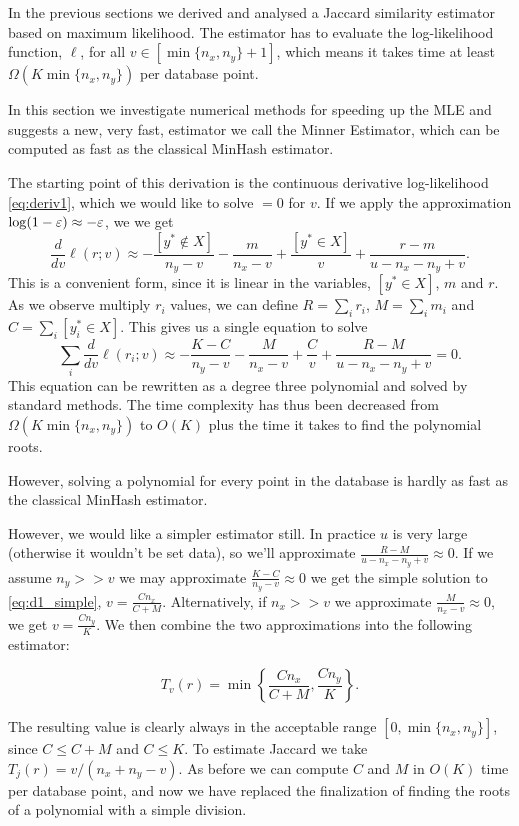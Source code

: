 In the previous sections we derived and analysed a Jaccard similarity estimator based on maximum likelihood.
The estimator has to evaluate the log-likelihood function, $\ell$, for all $v\in[\min\{n_x,n_y\}+1]$, which means it takes time at least $\Omega(K\min\{n_x,n_y\})$ per database point.

In this section we investigate numerical methods for speeding up the MLE and suggests a new, very fast, estimator we call the Minner Estimator, which can be computed as fast as the classical MinHash estimator.

The starting point of this derivation is the continuous derivative log-likelihood \cref{eq:deriv1},
which we would like to solve $=0$ for $v$.
If we apply the approximation $\log(1-\varepsilon) \approx -\varepsilon$,
we we get
\[
   \frac{d}{dv}\ell(r;v) \approx
   -\frac{[y^*\not\in X]}{n_y-v} 
   -\frac{m}{n_x-v} 
   +\frac{[y^*\in X]}{v} 
   +\frac{r-m}{u-n_x-n_y+v} 
   .
\]
This is a convenient form, since it is linear in the variables, $[y^*\in X]$, $m$ and $r$.
As we observe multiply $r_i$ values, we can define
$R = \sum_i r_i$, $M = \sum_i m_i$ and $C = \sum_i [y_i^*\in X]$.
This gives us a single equation to solve
\[
   \sum_i\frac{d}{dv}\ell(r_i; v) \approx
   -\frac{K-C}{n_y-v} 
   -\frac{M}{n_x-v} 
   +\frac{C}{v} 
   +\frac{R-M}{u-n_x-n_y+v} 
   = 0
   .
   \label{eq:d1_simple}
\]
This equation can be rewritten as a degree three polynomial and solved by standard methods.
The time complexity has thus been decreased from $\Omega(K\min\{n_x,n_y\})$ to $O(K)$ plus the time it takes to find the polynomial roots.

However, solving a polynomial for every point in the database is hardly as fast as the classical MinHash estimator.

However, we would like a simpler estimator still.
In practice $u$ is very large (otherwise it wouldn't be set data), so we'll approximate $\frac{R-M}{u-n_x-n_y+v}\approx 0$.
If we assume $n_y>\!>v$ we may approximate $\frac{K-C}{n_y-v}\approx 0$ we get the simple solution to \cref{eq:d1_simple}, $v=\frac{C n_x}{C+M}$.
Alternatively, if $n_x>\!>v$ we approximate $\frac{M}{n_x-v}\approx 0$, we get $v=\frac{C n_y}{K}$.
We then combine the two approximations into the following estimator:
\begin{definition}
\[
   T_v(r) = \min\left\{\frac{C n_x}{C+M}, \frac{C n_y}{K}\right\}.
   \label{eq:minner}
\]
\end{definition}

The resulting value is clearly always in the acceptable range $[0,\min\{n_x, n_y\}]$, since $C\le C+M$ and $C \le K$.
To estimate Jaccard we take $T_j(r) = v/(n_x + n_y - v)$.
As before we can compute $C$ and $M$ in $O(K)$ time per database point, and now we have replaced the finalization of finding the roots of a polynomial with a simple division.

